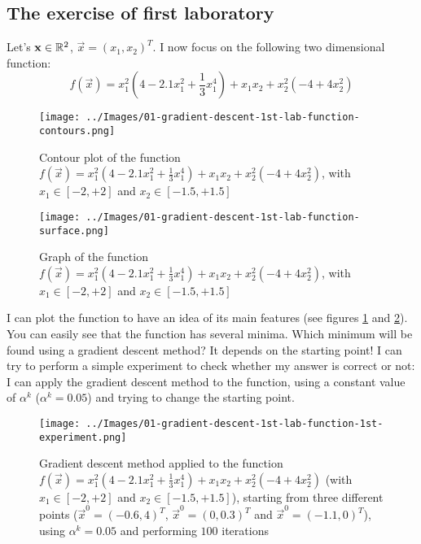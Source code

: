     \subsection{The exercise of first laboratory}
        Let's \(\mathbf{x} \in \mathbb{R}^2\), \(\vec{x} = (x_1, x_2)^T\). I now focus on the following two dimensional function:
        \[f(\vec{x}) = x_1^2(4 - 2.1x_1^2 + \frac{1}{3}x_1^4) + x_1x_2 + x_2^2(-4 + 4x_2^2)\]
        \begin{figure}
            \centering
            \texttt{[image: ../Images/01-gradient-descent-1st-lab-function-contours.png]}
            \caption{Contour plot of the function \(f(\vec{x}) = x_1^2(4 - 2.1x_1^2 + \frac{1}{3}x_1^4) + x_1x_2 + x_2^2(-4 + 4x_2^2)\), with \(x_1 \in [-2, +2]\) and \(x_2 \in [-1.5, +1.5]\)}
            \label{gradient-descent-1st-lab-function-contours}
        \end{figure}
        \begin{figure}
            \centering
            \texttt{[image: ../Images/01-gradient-descent-1st-lab-function-surface.png]}
            \caption{Graph of the function \(f(\vec{x}) = x_1^2(4 - 2.1x_1^2 + \frac{1}{3}x_1^4) + x_1x_2 + x_2^2(-4 + 4x_2^2)\), with \(x_1 \in [-2, +2]\) and \(x_2 \in [-1.5, +1.5]\)}
            \label{gradient-descent-1st-lab-function-surface}
        \end{figure}
        I can plot the function to have an idea of its main features (see figures \ref{gradient-descent-1st-lab-function-contours} and \ref{gradient-descent-1st-lab-function-surface}). You can easily see that the function has several minima. Which minimum will be found using a gradient descent method? It depends on the starting point! I can try to perform a simple experiment to check whether my answer is correct or not: I can apply the gradient descent method to the function, using a constant value of \(\alpha^k\) (\(\alpha^k = 0.05\)) and trying to change the starting point.
        \begin{figure}
            \centering
            \texttt{[image: ../Images/01-gradient-descent-1st-lab-function-1st-experiment.png]}
            \caption{Gradient descent method applied to the function \(f(\vec{x}) = x_1^2(4 - 2.1x_1^2 + \frac{1}{3}x_1^4) + x_1x_2 + x_2^2(-4 + 4x_2^2)\) (with \(x_1 \in [-2, +2]\) and \(x_2 \in [-1.5, +1.5]\)), starting from three different points (\(\vec{x}^0 = (-0.6,4)^T\), \(\vec{x}^0 = (0,0.3)^T\) and \(\vec{x}^0 = (-1.1,0)^T\)), using \(\alpha^k = 0.05\) and performing \(100\) iterations}
            \label{gradient-descent-1st-lab-function-1st-experiment}
        \end{figure}
